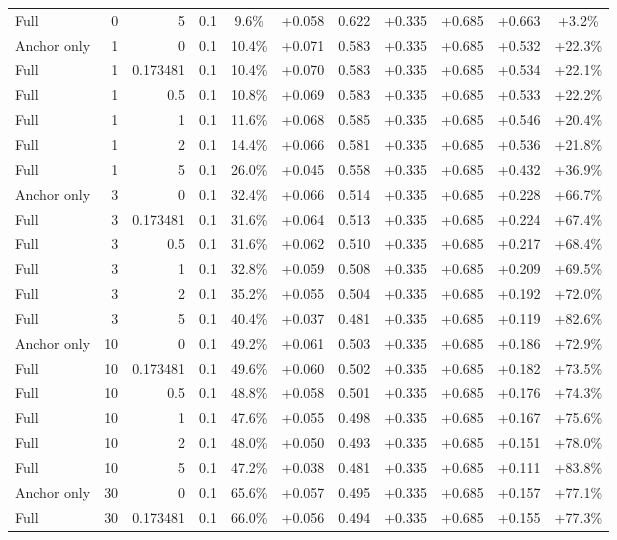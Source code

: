\begin{table}[htbp]
\begin{tabular}{lrrrccccccc}
Full & 0 & 5 & 0.1 & 9.6\% & +0.058 & 0.622 & +0.335 & +0.685 & +0.663 & +3.2\% \\
Anchor only & 1 & 0 & 0.1 & 10.4\% & +0.071 & 0.583 & +0.335 & +0.685 & +0.532 & +22.3\% \\
Full & 1 & 0.173481 & 0.1 & 10.4\% & +0.070 & 0.583 & +0.335 & +0.685 & +0.534 & +22.1\% \\
Full & 1 & 0.5 & 0.1 & 10.8\% & +0.069 & 0.583 & +0.335 & +0.685 & +0.533 & +22.2\% \\
Full & 1 & 1 & 0.1 & 11.6\% & +0.068 & 0.585 & +0.335 & +0.685 & +0.546 & +20.4\% \\
Full & 1 & 2 & 0.1 & 14.4\% & +0.066 & 0.581 & +0.335 & +0.685 & +0.536 & +21.8\% \\
Full & 1 & 5 & 0.1 & 26.0\% & +0.045 & 0.558 & +0.335 & +0.685 & +0.432 & +36.9\% \\
Anchor only & 3 & 0 & 0.1 & 32.4\% & +0.066 & 0.514 & +0.335 & +0.685 & +0.228 & +66.7\% \\
Full & 3 & 0.173481 & 0.1 & 31.6\% & +0.064 & 0.513 & +0.335 & +0.685 & +0.224 & +67.4\% \\
Full & 3 & 0.5 & 0.1 & 31.6\% & +0.062 & 0.510 & +0.335 & +0.685 & +0.217 & +68.4\% \\
Full & 3 & 1 & 0.1 & 32.8\% & +0.059 & 0.508 & +0.335 & +0.685 & +0.209 & +69.5\% \\
Full & 3 & 2 & 0.1 & 35.2\% & +0.055 & 0.504 & +0.335 & +0.685 & +0.192 & +72.0\% \\
Full & 3 & 5 & 0.1 & 40.4\% & +0.037 & 0.481 & +0.335 & +0.685 & +0.119 & +82.6\% \\
Anchor only & 10 & 0 & 0.1 & 49.2\% & +0.061 & 0.503 & +0.335 & +0.685 & +0.186 & +72.9\% \\
Full & 10 & 0.173481 & 0.1 & 49.6\% & +0.060 & 0.502 & +0.335 & +0.685 & +0.182 & +73.5\% \\
Full & 10 & 0.5 & 0.1 & 48.8\% & +0.058 & 0.501 & +0.335 & +0.685 & +0.176 & +74.3\% \\
Full & 10 & 1 & 0.1 & 47.6\% & +0.055 & 0.498 & +0.335 & +0.685 & +0.167 & +75.6\% \\
Full & 10 & 2 & 0.1 & 48.0\% & +0.050 & 0.493 & +0.335 & +0.685 & +0.151 & +78.0\% \\
Full & 10 & 5 & 0.1 & 47.2\% & +0.038 & 0.481 & +0.335 & +0.685 & +0.111 & +83.8\% \\
Anchor only & 30 & 0 & 0.1 & 65.6\% & +0.057 & 0.495 & +0.335 & +0.685 & +0.157 & +77.1\% \\
Full & 30 & 0.173481 & 0.1 & 66.0\% & +0.056 & 0.494 & +0.335 & +0.685 & +0.155 & +77.3\% \\

\end{tabular}
\end{table}
